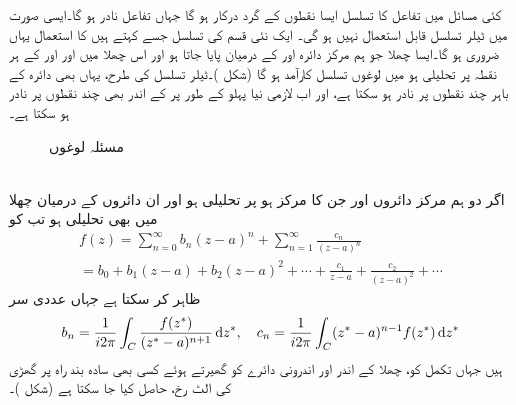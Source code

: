 کئی مسائل میں تفاعل  کا تسلسل ایسا نقطوں کے گرد درکار ہو گا جہاں تفاعل نادر ہو گا۔ایسی صورت میں ٹیلر تسلسل قابل استعمال نہیں ہو گی۔ ایک نئی قسم کی تسلسل جسے  کہتے ہیں کا استعمال یہاں ضروری ہو گا۔ایسا چھلا جو ہم مرکز دائرہ  اور  کے درمیان پایا جاتا ہو اور  اس چھلا میں اور  اور  کے ہر نقطہ پر تحلیلی ہو میں لوغوں تسلسل کارآمد ہو گا (شکل )۔ٹیلر تسلسل کی طرح، یہاں بھی  دائرہ  کے باہر چند نقطوں پر نادر ہو سکتا ہے، اور اب لازمی نیا پہلو کے طور پر  کے اندر بھی  چند نقطوں پر نادر ہو سکتا ہے۔
\begin{figure}
\centering
{}
\caption{مسئلہ لوغوں}
\label{شکل_ٹیلر_مسئلہ_لوغوں}
\end{figure}

\quad {}\\
اگر دو ہم مرکز دائروں  اور  جن کا مرکز  ہو پر  تحلیلی ہو اور ان دائروں کے درمیان چھلا میں بھی  تحلیلی ہو تب  کو 
\begin{multline}\label{مساوات_ٹیلر_لوغوں_تسلسل_الف}
f(z)=\sum\limits_{n=0}^{\infty} b_n(z-a)^n+\sum\limits_{n=1}^{\infty}\frac{c_n}{(z-a)^n}\\
=b_0+b_1(z-a)+b_2(z-a)^2+\cdots+\frac{c_1}{z-a}+\frac{c_2}{(z-a)^2}+\cdots
\end{multline}
ظاہر کر سکتا ہے جہاں عددی سر
\begin{align}\label{مساوات_ٹیلر_لوغوں_تسلسل_ب}
b_n=\frac{1}{i2\pi}\int_C\frac{f(z^*)}{(z^*-a)^{n+1}}\dif z^*,\quad c_n=\frac{1}{i2\pi}\int_C (z^*-a)^{n-1} f(z^*)\dif z^*
\end{align}
ہیں جہاں تکمل کو، چھلا کے اندر  اور اندرونی دائرے کو گھیرتے ہوئے  کسی بھی سادہ بند راہ  پر گھڑی کی الٹ رخ، حاصل کیا جا سکتا ہے (شکل )۔

